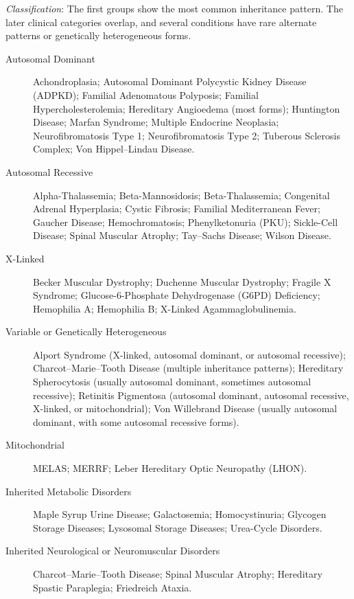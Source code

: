 \small
\noindent\textit{Classification}: The first groups show the most common inheritance pattern. The later clinical categories overlap, and several conditions have rare alternate patterns or genetically heterogeneous forms.

\medskip
\begin{description}
\item[Autosomal Dominant] Achondroplasia; Autosomal Dominant Polycystic Kidney Disease (ADPKD); Familial Adenomatous Polyposis; Familial Hypercholesterolemia; Hereditary Angioedema (most forms); Huntington Disease; Marfan Syndrome; Multiple Endocrine Neoplasia; Neurofibromatosis Type 1; Neurofibromatosis Type 2; Tuberous Sclerosis Complex; Von Hippel--Lindau Disease.

\item[Autosomal Recessive] Alpha-Thalassemia; Beta-Mannosidosis; Beta-Thalassemia; Congenital Adrenal Hyperplasia; Cystic Fibrosis; Familial Mediterranean Fever; Gaucher Disease; Hemochromatosis; Phenylketonuria (PKU); Sickle-Cell Disease; Spinal Muscular Atrophy; Tay--Sachs Disease; Wilson Disease.

\item[X-Linked] Becker Muscular Dystrophy; Duchenne Muscular Dystrophy; Fragile X Syndrome; Glucose-6-Phosphate Dehydrogenase (G6PD) Deficiency; Hemophilia A; Hemophilia B; X-Linked Agammaglobulinemia.

\item[Variable or Genetically Heterogeneous] Alport Syndrome (X-linked, autosomal dominant, or autosomal recessive); Charcot--Marie--Tooth Disease (multiple inheritance patterns); Hereditary Spherocytosis (usually autosomal dominant, sometimes autosomal recessive); Retinitis Pigmentosa (autosomal dominant, autosomal recessive, X-linked, or mitochondrial); Von Willebrand Disease (usually autosomal dominant, with some autosomal recessive forms).

\item[Mitochondrial] MELAS; MERRF; Leber Hereditary Optic Neuropathy (LHON).

\item[Inherited Metabolic Disorders] Maple Syrup Urine Disease; Galactosemia; Homocystinuria; Glycogen Storage Diseases; Lysosomal Storage Diseases; Urea-Cycle Disorders.

\item[Inherited Neurological or Neuromuscular Disorders] Charcot--Marie--Tooth Disease; Spinal Muscular Atrophy; Hereditary Spastic Paraplegia; Friedreich Ataxia.


\end{description}

